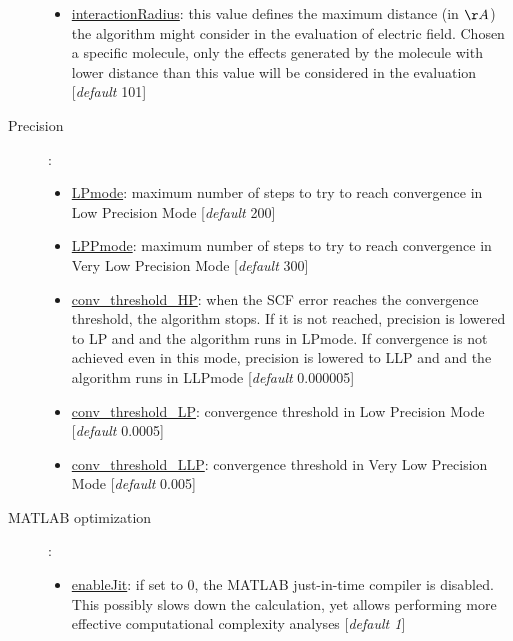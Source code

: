 \documentclass[a4paper,10pt]{article}
\begin{document}
\begin{description}
\begin{itemize}
	\item \underline{interactionRadius}: this value defines the maximum distance (in $\AA$) the algorithm might consider in the evaluation of electric field. Chosen a specific molecule, only the effects generated by the molecule with lower distance than this value will be considered in the evaluation [\textit{default} 101] 
	\end{itemize}
\item[Precision]:
	\begin{itemize}
	\item \underline{LPmode}: maximum number of steps to try to reach convergence in Low Precision Mode [\textit{default} 200] 
	\item \underline{LPPmode}: maximum number of steps to try to reach convergence in Very Low Precision Mode [\textit{default} 300] 
	\item \underline{conv\_threshold\_HP}: when the SCF error reaches the convergence threshold, the algorithm stops. If it is not reached, precision is lowered to LP and and the algorithm runs in LPmode. If convergence is not achieved even in this mode, precision is lowered to LLP and and the algorithm runs in LLPmode [\textit{default} 0.000005] 
	\item \underline{conv\_threshold\_LP}: convergence threshold in Low Precision Mode [\textit{default} 0.0005] 
	\item \underline{conv\_threshold\_LLP}: convergence threshold in Very Low Precision Mode [\textit{default} 0.005] 
	\end{itemize}
\item[MATLAB optimization]:
	\begin{itemize}
	\item \underline{enableJit}: if set to 0, the MATLAB just-in-time compiler is disabled. This possibly slows down the calculation, yet allows performing more effective computational complexity analyses [\textit{default 1}] 
	\end{itemize}

\end{description}
\end{document}
